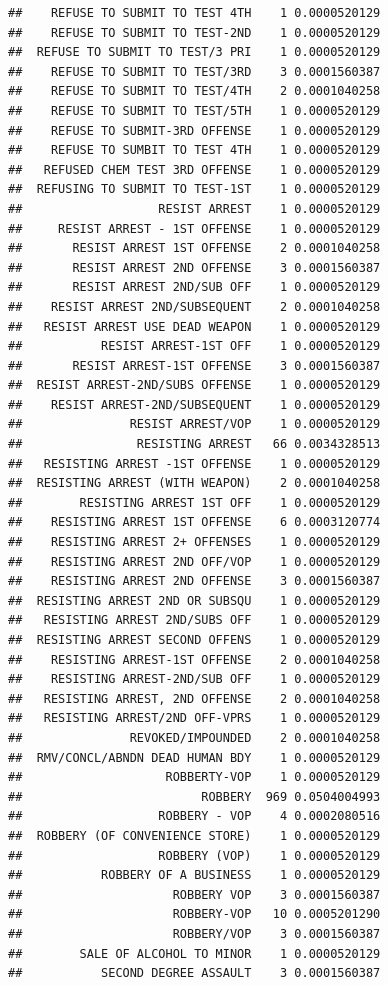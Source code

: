 \documentclass[]{book}
\begin{document}
\begin{verbatim}
##    REFUSE TO SUBMIT TO TEST 4TH    1 0.0000520129
##    REFUSE TO SUBMIT TO TEST-2ND    1 0.0000520129
##  REFUSE TO SUBMIT TO TEST/3 PRI    1 0.0000520129
##    REFUSE TO SUBMIT TO TEST/3RD    3 0.0001560387
##    REFUSE TO SUBMIT TO TEST/4TH    2 0.0001040258
##    REFUSE TO SUBMIT TO TEST/5TH    1 0.0000520129
##    REFUSE TO SUBMIT-3RD OFFENSE    1 0.0000520129
##    REFUSE TO SUMBIT TO TEST 4TH    1 0.0000520129
##   REFUSED CHEM TEST 3RD OFFENSE    1 0.0000520129
##  REFUSING TO SUBMIT TO TEST-1ST    1 0.0000520129
##                   RESIST ARREST    1 0.0000520129
##     RESIST ARREST - 1ST OFFENSE    1 0.0000520129
##       RESIST ARREST 1ST OFFENSE    2 0.0001040258
##       RESIST ARREST 2ND OFFENSE    3 0.0001560387
##       RESIST ARREST 2ND/SUB OFF    1 0.0000520129
##    RESIST ARREST 2ND/SUBSEQUENT    2 0.0001040258
##   RESIST ARREST USE DEAD WEAPON    1 0.0000520129
##           RESIST ARREST-1ST OFF    1 0.0000520129
##       RESIST ARREST-1ST OFFENSE    3 0.0001560387
##  RESIST ARREST-2ND/SUBS OFFENSE    1 0.0000520129
##    RESIST ARREST-2ND/SUBSEQUENT    1 0.0000520129
##               RESIST ARREST/VOP    1 0.0000520129
##                RESISTING ARREST   66 0.0034328513
##   RESISTING ARREST -1ST OFFENSE    1 0.0000520129
##  RESISTING ARREST (WITH WEAPON)    2 0.0001040258
##        RESISTING ARREST 1ST OFF    1 0.0000520129
##    RESISTING ARREST 1ST OFFENSE    6 0.0003120774
##    RESISTING ARREST 2+ OFFENSES    1 0.0000520129
##    RESISTING ARREST 2ND OFF/VOP    1 0.0000520129
##    RESISTING ARREST 2ND OFFENSE    3 0.0001560387
##  RESISTING ARREST 2ND OR SUBSQU    1 0.0000520129
##   RESISTING ARREST 2ND/SUBS OFF    1 0.0000520129
##  RESISTING ARREST SECOND OFFENS    1 0.0000520129
##    RESISTING ARREST-1ST OFFENSE    2 0.0001040258
##    RESISTING ARREST-2ND/SUB OFF    1 0.0000520129
##   RESISTING ARREST, 2ND OFFENSE    2 0.0001040258
##   RESISTING ARREST/2ND OFF-VPRS    1 0.0000520129
##               REVOKED/IMPOUNDED    2 0.0001040258
##  RMV/CONCL/ABNDN DEAD HUMAN BDY    1 0.0000520129
##                    ROBBERTY-VOP    1 0.0000520129
##                         ROBBERY  969 0.0504004993
##                   ROBBERY - VOP    4 0.0002080516
##  ROBBERY (OF CONVENIENCE STORE)    1 0.0000520129
##                   ROBBERY (VOP)    1 0.0000520129
##           ROBBERY OF A BUSINESS    1 0.0000520129
##                     ROBBERY VOP    3 0.0001560387
##                     ROBBERY-VOP   10 0.0005201290
##                     ROBBERY/VOP    3 0.0001560387
##        SALE OF ALCOHOL TO MINOR    1 0.0000520129
##           SECOND DEGREE ASSAULT    3 0.0001560387

\end{verbatim}
\end{document}

